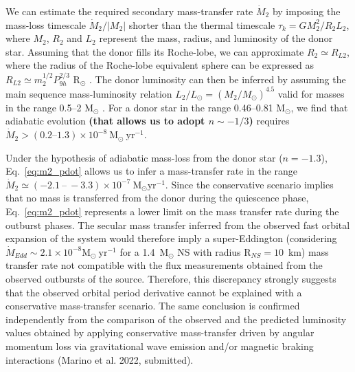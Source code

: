 \documentclass[fleqn,usenatbib]{mnras}
\begin{document}
We can estimate the required secondary mass-transfer rate $\dot{M}_2$ by imposing the mass-loss timescale $\dot{M}_2/|M_2|$ shorter than the thermal timescale $\tau_k=GM_2^2/R_2L_2$, where $M_2$, $R_2$ and $L_2$ represent the mass, radius, and luminosity of the donor star. Assuming that the donor fills its Roche-lobe, we can approximate $R_2\simeq R_{L2}$, where the radius of the Roche-lobe equivalent sphere can be expressed as $R_{L2}\simeq m_2^{1/2} P_{9h}^{2/3}$ R$_\odot$ \citep[obtained by combining Paczy\'nski's Roche-lobe analytic approximation with Kepler's third law;][]{Paczynski71}. The donor luminosity can then be inferred by assuming the main sequence mass-luminosity relation $L_2/L_{\odot}=(M_2/M_{\odot})^{4.5}$ valid for masses in the range 0.5--2 M$_\odot$ \citep{Chabrier:2009vh}. For a donor star in the range 0.46--0.81 M$_\odot$, we find that adiabatic evolution \textbf{(that allows us to adopt $n\sim-1/3$)} requires $\dot{M}_2>(0.2\mbox{--}1.3)\times 10^{-8}~\text{M}_{\odot}~\text{yr}^{-1}$.

Under the hypothesis of adiabatic mass-loss from the donor star ($n=-1.3$), Eq.~\ref{eq:m2_pdot} allows us to infer a mass-transfer rate in the range $\dot{M}_{2}\simeq(-2.1 ~\mbox{--}~ -3.3)\times 10^{-7}~\text{M}_{\odot} \text{yr}^{-1}$. Since the conservative scenario implies that no mass is transferred from the donor during the quiescence phase, Eq.~\ref{eq:m2_pdot} represents a lower limit on the mass transfer rate during the outburst phases. The secular mass transfer inferred from the observed fast orbital expansion of the system would therefore imply a super-Eddington (considering $\dot{M}_{Edd}\sim2.1\times 10^{-8} \text{M}_{\odot}~\text{yr}^{-1}$ for a 1.4~$\text{M}_{\odot}$ NS with radius $\text{R}_{NS}=10$~km) mass transfer rate not compatible with the flux measurements obtained from the observed outbursts of the source. Therefore, this discrepancy strongly suggests that the observed orbital period derivative cannot be explained with a conservative mass-transfer scenario. The same conclusion is confirmed independently from the comparison of the observed and the predicted luminosity values obtained by applying conservative mass-transfer driven by angular momentum loss via gravitational wave emission and/or magnetic braking interactions (Marino et al. 2022, submitted).


\end{document}

